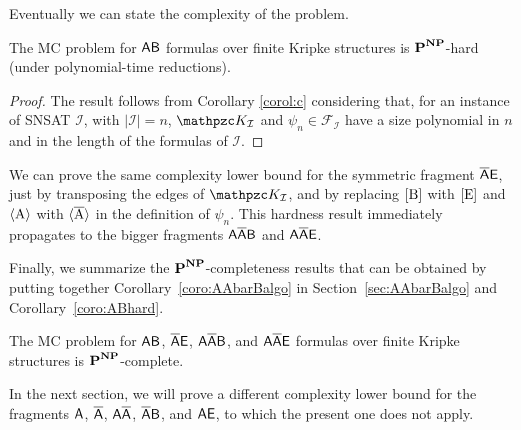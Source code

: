 Eventually we can state the complexity of the problem.

\begin{corollary}\label{coro:ABhard}
	The MC problem for $\mathsf{AB}$ formulas over finite Kripke structures is $\textbf{P}^{\textbf{NP}}$-hard (under polynomial-time reductions).
\end{corollary}
\begin{proof}
	The result follows from Corollary \ref{corol:c} considering that, for an instance of SNSAT $\mathcal{I}$, with $|\mathcal{I}|=n$, $\Ku_\mathcal{I}$ and $\psi_n\in \mathcal{F}_\mathcal{I}$ have a size polynomial in $n$ and in the length of the formulas of $\mathcal{I}$. %
\end{proof}

We can prove the same complexity lower bound for the symmetric fragment $\mathsf{\overline{A}E}$, just by transposing the edges of $\Ku_\mathcal{I}$, and by replacing $\operatorname{\mathopen[ B \mathclose]}$ with $\operatorname{\mathopen[ E \mathclose]}$ and $\operatorname{\langle A\rangle}$ with $\operatorname{\langle \overline{A}\rangle}$ in the definition of $\psi_n$. This hardness result immediately propagates to the bigger fragments $\mathsf{A\overline{A}B}$ and $\mathsf{A\overline{A}E}$.

Finally,  we summarize the $\textbf{P}^{\textbf{NP}}$-completeness results that can be obtained by putting together Corollary~\ref{coro:AAbarBalgo} in Section~\ref{sec:AAbarBalgo} and Corollary~\ref{coro:ABhard}.
\begin{corollary}
The MC problem for $\mathsf{AB}$, $\mathsf{\overline{A}E}$, $\mathsf{A\overline{A}B}$, and $\mathsf{A\overline{A}E}$ formulas over finite Kripke structures is $\textbf{P}^{\textbf{NP}}$-complete.
\end{corollary}

In the next section, we will prove a different complexity lower bound for the fragments $\mathsf{A}$, $\mathsf{\overline{A}}$, $\mathsf{A\overline{A}}$, $\mathsf{\overline{A}B}$, and $\mathsf{AE}$, to which the present one does not apply.
